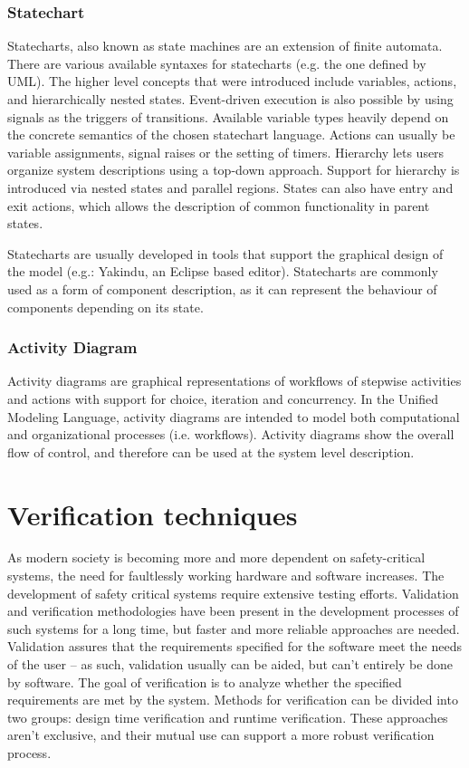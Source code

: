 \subsubsection{Statechart}

Statecharts, also known as state machines are an extension of finite automata. There are various available syntaxes for statecharts (e.g. the one defined by UML\citep{stcuml}). The higher level concepts that were introduced include variables, actions, and hierarchically nested states. Event-driven execution is also possible by using signals as the triggers of transitions. Available variable types heavily depend on the concrete semantics of the chosen statechart language. Actions can usually be variable assignments, signal raises or the setting of timers. Hierarchy lets users organize system descriptions using a top-down approach. Support for hierarchy is introduced via nested states and parallel regions. States can also have entry and exit actions, which allows the description of common functionality in parent states\citep{stcmove}.%

Statecharts are usually developed in tools that support the graphical design of the model (e.g.: Yakindu\citep{yakinduu}, an Eclipse based editor).
Statecharts are commonly used as a form of component description, as it can represent the behaviour of components depending on its state.

\subsubsection{Activity Diagram}

Activity diagrams are graphical representations of workflows of stepwise activities and actions with support for choice, iteration and concurrency. In the Unified Modeling Language, activity diagrams are intended to model both computational and organizational processes (i.e. workflows). Activity diagrams show the overall flow of control, and therefore can be used at the system level description.

\section{Verification techniques} 

As modern society is becoming more and more dependent on safety-critical systems, the need for faultlessly working hardware and software increases. The development of safety critical systems require extensive testing efforts. Validation and verification methodologies have been present in the development processes of such systems for a long time\citep{ieee1012}, but faster and more reliable approaches are needed. Validation assures that the requirements specified for the software meet the needs of the user -- as such, validation usually can be aided, but can’t entirely be done by software. The goal of verification is to analyze whether the specified requirements are met by the system. Methods for verification can be divided into two groups: design time verification and runtime verification. These approaches aren't exclusive, and their mutual use can support a more robust verification process.

